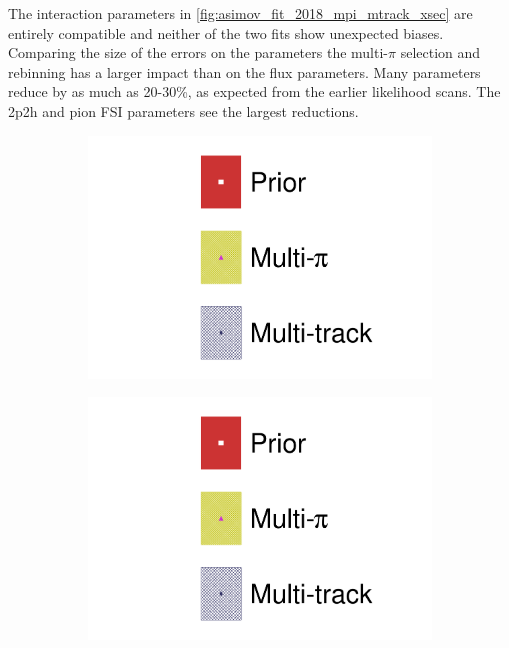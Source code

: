 The interaction parameters in \autoref{fig:asimov_fit_2018_mpi_mtrack_xsec} are entirely compatible and neither of the two fits show unexpected biases. Comparing the size of the errors on the parameters the multi-$\pi$ selection and rebinning has a larger impact than on the flux parameters. Many parameters reduce by as much as 20-30\%, as expected from the earlier likelihood scans. The 2p2h and pion FSI parameters see the largest reductions.
\begin{figure}[h]
	\centering
	\begin{subfigure}[t]{0.49\textwidth}
		\includegraphics[width=\textwidth,page=18, trim={0mm 0mm 0mm 9mm}, clip]{figures/mach3/2018/asimov/2018a_FixedCov_RedCov_Mpi_Asimov_merg_2018a_NewDetMatrix_OrderSwitched_Data2to8_merge}
	\end{subfigure}
	\begin{subfigure}[t]{0.49\textwidth}
		\includegraphics[width=\textwidth,page=19, trim={0mm 0mm 0mm 9mm}, clip]{figures/mach3/2018/asimov/2018a_FixedCov_RedCov_Mpi_Asimov_merg_2018a_NewDetMatrix_OrderSwitched_Data2to8_merge}
	\end{subfigure}
	

\end{figure}
